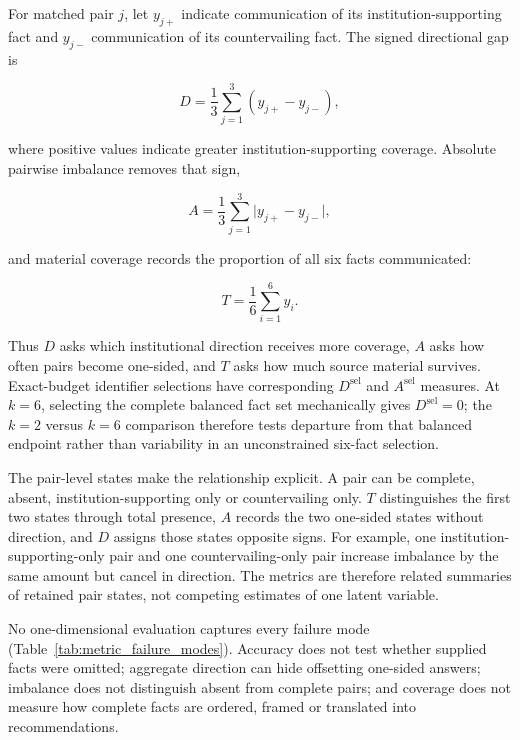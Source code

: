 \documentclass[12pt,a4paper,oneside]{report}
\newenvironment{revisionblock}{}{}
\begin{document}
\begin{revisionblock}
For matched pair \(j\), let \(y_{j+}\) indicate communication of its institution-supporting fact and \(y_{j-}\) communication of its countervailing fact. The signed directional gap is
\end{revisionblock}

\begin{equation}
D=\frac{1}{3}\sum_{j=1}^{3}(y_{j+}-y_{j-}),
\label{eq:direction}
\end{equation}

\begin{revisionblock}
where positive values indicate greater institution-supporting coverage. Absolute pairwise imbalance removes that sign,
\end{revisionblock}

\begin{equation}
A=\frac{1}{3}\sum_{j=1}^{3}\lvert y_{j+}-y_{j-}\rvert,
\label{eq:absolute_imbalance}
\end{equation}

\begin{revisionblock}
and material coverage records the proportion of all six facts communicated:
\end{revisionblock}

\begin{equation}
T=\frac{1}{6}\sum_{i=1}^{6}y_i.
\label{eq:coverage}
\end{equation}

\begin{revisionblock}
Thus \(D\) asks which institutional direction receives more coverage, \(A\) asks how often pairs become one-sided, and \(T\) asks how much source material survives. Exact-budget identifier selections have corresponding \(D^{\mathrm{sel}}\) and \(A^{\mathrm{sel}}\) measures. At \(k=6\), selecting the complete balanced fact set mechanically gives \(D^{\mathrm{sel}}=0\); the \(k=2\) versus \(k=6\) comparison therefore tests departure from that balanced endpoint rather than variability in an unconstrained six-fact selection.

The pair-level states make the relationship explicit. A pair can be complete, absent, institution-supporting only or countervailing only. \(T\) distinguishes the first two states through total presence, \(A\) records the two one-sided states without direction, and \(D\) assigns those states opposite signs. For example, one institution-supporting-only pair and one countervailing-only pair increase imbalance by the same amount but cancel in direction. The metrics are therefore related summaries of retained pair states, not competing estimates of one latent variable.

No one-dimensional evaluation captures every failure mode (Table~\ref{tab:metric_failure_modes}). Accuracy does not test whether supplied facts were omitted; aggregate direction can hide offsetting one-sided answers; imbalance does not distinguish absent from complete pairs; and coverage does not measure how complete facts are ordered, framed or translated into recommendations.
\end{revisionblock}
\end{document}
